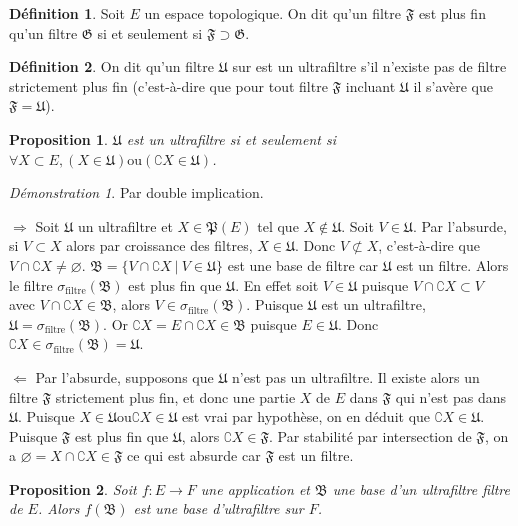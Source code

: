 \documentclass[a4paper, 11pt, french]{book}
\newenvironment{itemise}{\itemize}{\enditemize}
\theoremstyle{plain} %
\newtheorem{proposition}{Proposition}
\theoremstyle{definition} %
\newtheorem{definition}{Définition}
\theoremstyle{remark} %
\newtheorem*{demonstration}{Démonstration}
\newcommand{\1}{\mathds{1}}
\newcommand\vide{\varnothing}
\newcommand{\ou}{\mathrel{\mathrm{ou}}}
\renewcommand{\frak}[1]{\mathfrak{#1}}
\renewcommand{\rm}[1]{\mathrm{#1}}
\newcommand\ens[2]{\{#1 \ |\ #2\}}
\newcommand\equivalence[3]{
	\begin{demonstration}
		#1
		\begin{itemise}
			\item[$\Longrightarrow$] #2
			\item[$\Longleftarrow$] #3
		\end{itemise}
	\end{demonstration}
}
\begin{document}
\begin{definition}
	Soit $E$ un espace topologique.
	On dit qu'un filtre $\frak{F}$ est plus fin qu'un filtre $\frak{G}$ si et seulement si $\frak{F}\supset\frak{G}$.
\end{definition}

\begin{definition}
	On dit qu'un filtre $\frak{U}$ sur est un ultrafiltre s'il n'existe pas de filtre strictement plus fin (c'est-à-dire que pour tout filtre $\frak{F}$ incluant $\frak{U}$ il s'avère que $\frak{F}=\frak{U}$).
\end{definition}

\begin{proposition}
	$\frak{U}$ est un ultrafiltre si et seulement si $\forall X\subset E, (X\in\frak{U})\ou(\complement X\in\frak{U})$.
\end{proposition}

\equivalence{Par double implication.}{
	Soit $\frak{U}$ un ultrafiltre et $X\in\frak{P}(E)$ tel que $X\notin\frak{U}$.
		Soit $V\in\frak{U}$.
		Par l'absurde, si $V\subset X$ alors par croissance des filtres, $X\in\frak{U}$.
		Donc $V\not\subset X$, c'est-à-dire que $V\cap\complement X\neq\vide$.
		$\frak{B}=\ens{V\cap\complement X}{V\in\frak{U}}$ est une base de filtre car $\frak{U}$ est un filtre.
		Alors le filtre $\sigma_\rm{filtre}(\frak{B})$ est plus fin que $\frak{U}$.
		En effet soit $V\in\frak{U}$ puisque $V\cap\complement X\subset V$ avec $V\cap\complement X\in\frak{B}$, alors $V\in\sigma_\rm{filtre}(\frak{B})$.
		Puisque $\frak{U}$ est un ultrafiltre, $\frak{U}=\sigma_\rm{filtre}(\frak{B})$.
		Or $\complement X=E\cap\complement X\in\frak{B}$ puisque $E\in\frak{U}$.
		Donc $\complement X\in\sigma_\rm{filtre}(\frak{B})=\frak{U}$.
}{
	Par l'absurde, supposons que $\frak{U}$ n'est pas un ultrafiltre.
		Il existe alors un filtre $\frak{F}$ strictement plus fin, et donc une partie $X$ de $E$ dans $\frak{F}$ qui n'est pas dans $\frak{U}$.
		Puisque $X\in\frak{U}\ou\complement X\in\frak{U}$ est vrai par hypothèse, on en déduit que $\complement X\in\frak{U}$.
		Puisque $\frak{F}$ est plus fin que $\frak{U}$, alors $\complement X\in\frak{F}$.
		Par stabilité par intersection de $\frak{F}$, on a $\vide=X\cap\complement X\in\frak{F}$ ce qui est absurde car $\frak{F}$ est un filtre.
}

\begin{proposition}
	Soit $f:E\rightarrow F$ une application et $\frak{B}$ une base d'un ultrafiltre filtre de $E$.
	Alors $f(\frak{B})$ est une base d'ultrafiltre sur $F$.
\end{proposition}
\end{document}
